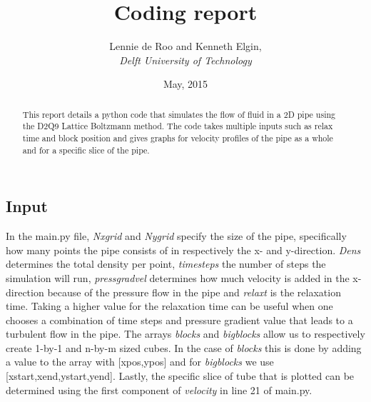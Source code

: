 \documentclass[a4paper]{article}
\begin{document}
\title{\textbf{Coding report}}
\author{Lennie de Roo and Kenneth Elgin, \\
 \emph{Delft University of Technology}}
\date{\normalsize{May, 2015}}
\maketitle 
\noindent \hrulefill
\renewcommand{\abstractname}{}
\begin{abstract}
\noindent This report details a python code that simulates the flow of fluid in a 2D pipe using the D2Q9 Lattice Boltzmann method. The code takes multiple inputs such as relax time and block position and gives graphs for velocity profiles of the pipe as a whole and for a specific slice of the pipe.
\end{abstract}
\hrulefill
\begin{multicols*}{2}
\subsection*{Input}
In the main.py file, \emph{Nxgrid} and \emph{Nygrid} specify the size of the pipe, specifically how many points the pipe consists of in respectively the x- and y-direction. \emph{Dens} determines the total density per point, \emph{timesteps} the number of steps the simulation will run, \emph{pressgradvel} determines how much velocity is added in the x-direction because of the pressure flow in the pipe and \emph{relaxt} is the relaxation time. Taking a higher value for the relaxation time can be useful when one chooses a combination of time steps and pressure gradient value that leads to a turbulent flow in the pipe. The arrays \emph{blocks} and \emph{bigblocks} allow us to respectively create 1-by-1 and n-by-m sized cubes. In the case of \emph{blocks} this is done by adding a value to the array with [xpos,ypos] and for \emph{bigblocks} we use [xstart,xend,ystart,yend]. Lastly, the specific slice of tube that is plotted can be determined using the first component of \emph{velocity} in line 21 of main.py.

\end{multicols*}
\end{document}
